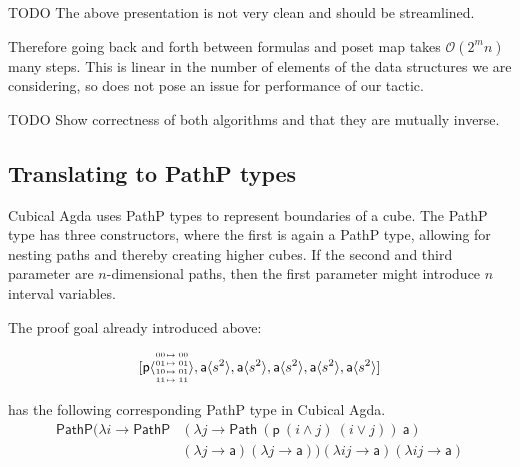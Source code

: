 \documentclass{llncs}
\newcommand{\continuation}{??}
\newenvironment{examplecontd}[1]
{\renewcommand{\continuation}{\ref{#1}}\expcont[continued]}
{\endexpcont}
\newcommand{\todo}[1]{
  \begin{tcolorbox}
    TODO {#1} 
  \end{tcolorbox}
}
\newcommand{\mlist}[1]{[ {#1} ]}
\newcommand{\smap}[1]{s^{{#1}}}
\newcommand{\cont}[2]{\ensuremath{ \ifthenelse{\equal{#2}{}}{#1}{{#1}\langle{#2}\rangle}} }
\newcommand{\cset}[1]{\ensuremath{\mathsf{{#1}}}}
\newcommand{\substfour}[4]{\tiny
  \arraycolsep=.4pt\def\arraystretch{1}
  \begin{array}{ll}
    00 &\mapsto {#1} \\
    01 &\mapsto {#2} \\
    10 &\mapsto {#3} \\
    11 &\mapsto {#4} 
  \end{array}
}
\begin{document}
\begin{proposition}
\todo{The above presentation is not very clean and should be streamlined.}

Therefore going back and forth between formulas and poset map takes
$\mathcal{O}(2^mn)$ many steps. This is linear in the number of elements of the
data structures we are considering, so does not pose an issue for performance of
our tactic.


\todo{Show correctness of both algorithms and that they are mutually inverse.}

\subsection{Translating to PathP types}

Cubical Agda uses PathP types to represent boundaries of a cube. The PathP type
has three constructors, where the first is again a PathP type, allowing for
nesting paths and thereby creating higher cubes. If the second and third
parameter are $n$-dimensional paths, then the first parameter might introduce
$n$ interval variables.


\begin{examplecontd}{exp:sndsphere}
  
The proof goal already introduced above:

$$\mlist{ \cont{\cset{p}}{\substfour{00}{01}{01}{11}} ,
  \cont{\cset{a}}{\smap{2}} , \cont{\cset{a}}{\smap{2}} ,
  \cont{\cset{a}}{\smap{2}} , \cont{\cset{a}}{\smap{2}} ,
  \cont{\cset{a}}{\smap{2}}}$$

has the following corresponding PathP type in Cubical Agda.
  \begin{align*}
    \mathsf{PathP} (\lambda i \to \mathsf{PathP} &(\lambda j \to  \mathsf{Path} \ (\cset{p} \ (i \wedge
                                                   j) \ (i \vee j))\ \cset{a})\\
                                                 &(\lambda j \to \cset{a}) (\lambda j \to \cset{a}))
                                                   (\lambda i j \to \cset{a}) (\lambda i j \to \cset{a})
  \end{align*}
\end{examplecontd}


\end{proposition}
\end{document}
